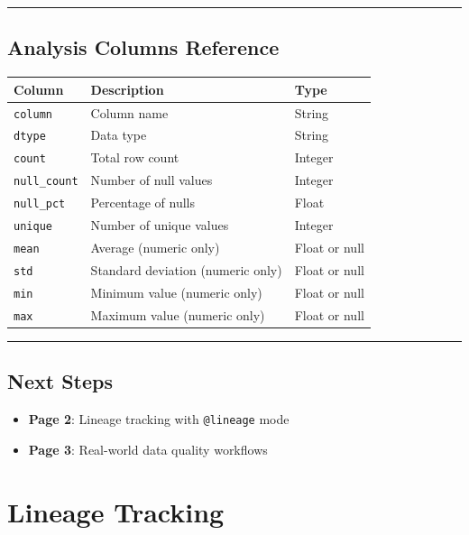 \documentclass[
  letterpaper,
]{scrbook}
\providecommand{\tightlist}{%
  \setlength{\itemsep}{0pt}\setlength{\parskip}{0pt}}
\begin{document}
\begin{center}\rule{0.5\linewidth}{0.5pt}\end{center}

\section{Analysis Columns Reference}\label{analysis-columns-reference}

\begin{longtable}[]{@{}lll@{}}
\toprule\noalign{}
Column & Description & Type \\
\midrule\noalign{}
\endhead
\bottomrule\noalign{}
\endlastfoot
\texttt{column} & Column name & String \\
\texttt{dtype} & Data type & String \\
\texttt{count} & Total row count & Integer \\
\texttt{null\_count} & Number of null values & Integer \\
\texttt{null\_pct} & Percentage of nulls & Float \\
\texttt{unique} & Number of unique values & Integer \\
\texttt{mean} & Average (numeric only) & Float or null \\
\texttt{std} & Standard deviation (numeric only) & Float or null \\
\texttt{min} & Minimum value (numeric only) & Float or null \\
\texttt{max} & Maximum value (numeric only) & Float or null \\
\end{longtable}

\begin{center}\rule{0.5\linewidth}{0.5pt}\end{center}

\section{Next Steps}\label{next-steps-16}

\begin{itemize}
\tightlist
\item
  \textbf{Page 2}: Lineage tracking with \texttt{@lineage} mode
\item
  \textbf{Page 3}: Real-world data quality workflows
\end{itemize}

\chapter{Lineage Tracking}\label{lineage-tracking-1}
\end{document}
